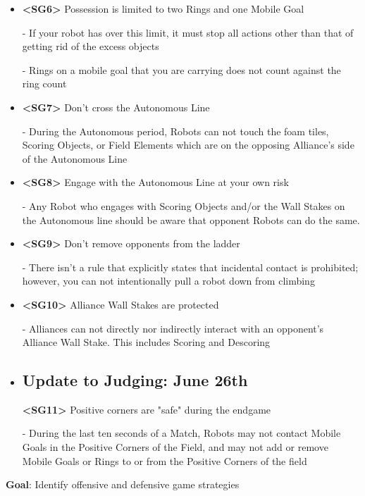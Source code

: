 {\begin{itemize}
- Prior to the start of the Match each preload must be contacting a robot of the same color as the preload 
\item
\textbf{\textless SG6\textgreater} Possession is limited to two Rings and one Mobile Goal

- If your robot has over this limit, it must stop all actions other than that of getting rid of the excess objects

- Rings on a mobile goal that you are carrying does not count against the ring count 
\item
\textbf{\textless SG7\textgreater} Don't cross the Autonomous Line

- During the Autonomous period, Robots can not touch the foam tiles, Scoring Objects, or Field Elements which are on the opposing Alliance's side of the Autonomous Line 

\item
\textbf{\textless SG8\textgreater} Engage with the Autonomous Line at your own risk 

- Any Robot who engages with Scoring Objects and/or the Wall Stakes on the Autonomous line should be aware that opponent Robots can do the same. 
\item
\textbf{\textless SG9\textgreater} Don't remove opponents from the ladder 

- There isn't a rule that explicitly states that incidental contact is prohibited; however, you can not intentionally pull a robot down from climbing 
\item
\textbf{\textless SG10\textgreater} Alliance Wall Stakes are protected

- Alliances can not directly nor indirectly interact with an opponent's Alliance Wall Stake. This includes Scoring and Descoring 
\item 
\subsection*{Update to Judging: June 26th}
\textbf{\textless SG11\textgreater} Positive corners are "safe" during the endgame

- During the last ten seconds of a Match, Robots may not contact Mobile Goals in the Positive Corners of the Field, and may not add or remove Mobile Goals or Rings to or from the Positive Corners of the field
\end{itemize}
}
\label{Game-Strategies}
\textbf{Goal}: Identify offensive and defensive game strategies
